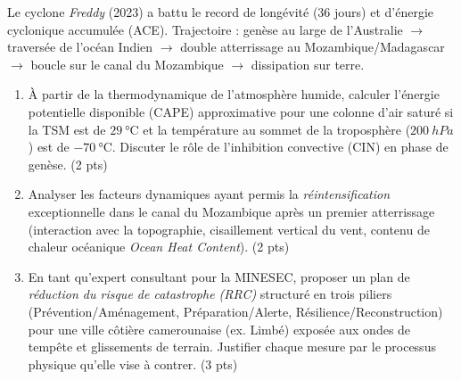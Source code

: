 \documentclass[11pt]{article}
\begin{document}
\begin{exercice}
Le cyclone \textit{Freddy} (2023) a battu le record de longévité (36 jours) et d'énergie cyclonique accumulée (ACE). Trajectoire : genèse au large de l'Australie $\rightarrow$ traversée de l'océan Indien $\rightarrow$ double atterrissage au Mozambique/Madagascar $\rightarrow$ boucle sur le canal du Mozambique $\rightarrow$ dissipation sur terre.

\begin{enumerate}
\item À partir de la thermodynamique de l'atmosphère humide, calculer l'énergie potentielle disponible (CAPE) approximative pour une colonne d'air saturé si la TSM est de $\SI{29}{\celsius}$ et la température au sommet de la troposphère ($\SI{200}{hPa}$) est de $\SI{-70}{\celsius}$. Discuter le rôle de l'inhibition convective (CIN) en phase de genèse. (2 pts)
\item Analyser les facteurs dynamiques ayant permis la \textit{réintensification} exceptionnelle dans le canal du Mozambique après un premier atterrissage (interaction avec la topographie, cisaillement vertical du vent, contenu de chaleur océanique \textit{Ocean Heat Content}). (2 pts)
\item En tant qu'expert consultant pour la MINESEC, proposer un plan de \textit{réduction du risque de catastrophe (RRC)} structuré en trois piliers (Prévention/Aménagement, Préparation/Alerte, Résilience/Reconstruction) pour une ville côtière camerounaise (ex. Limbé) exposée aux ondes de tempête et glissements de terrain. Justifier chaque mesure par le processus physique qu'elle vise à contrer. (3 pts)
\end{enumerate}
\end{exercice}
\end{document}

